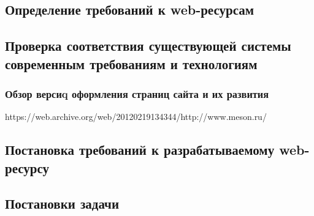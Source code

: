 \subsection{Определение требований к web-ресурсам}
    
\subsection{Проверка соответствия существующей системы современным требованиям и технологиям}   %
    \subsubsection{Обзор версиq оформления страниц сайта и их развития}                          %
        https://web.archive.org/web/20120219134344/http://www.meson.ru/

\subsection{Постановка требований к разрабатываемому web-ресурсу}                               %

\subsection{Постановки задачи}                                                                  %

\clearpage
